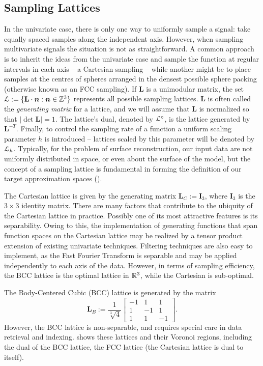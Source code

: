 \subsection{Sampling Lattices} \label{sec:smpl_review}
In the univariate case, there is only one way to uniformly sample a signal: take equally spaced samples along the independent axis. 
However, when sampling multivariate signals the situation is not as straightforward. 
A common approach is to inherit the ideas from the univariate case and sample the function at regular intervals in each axis -- a Cartesian sampling --  while another might be to place samples at the centres of spheres arranged in the densest possible sphere packing (otherwise known as an FCC sampling). 
If $\mathbf{L}$ is a unimodular matrix, the set $\mathcal{L} := \{\mathbf{L}\cdot\boldsymbol{n} : \boldsymbol{n} \in \mathbb{Z}^3 \}$ represents all possible sampling lattices. 
$\mathbf{L}$ is often called the \emph{generating matrix} for a lattice, and we will assume that $\mathbf{L}$ is normalized so that $\left|\det\mathbf{L}\right| = 1$. 
The lattice's dual, denoted by $\mathcal{L}^{\circ}$, is the lattice generated by $\mathbf{L}^{-T}$. Finally, to control the sampling rate of a function a uniform scaling parameter $h$ is introduced -- lattices scaled by this parameter will be denoted by $\mathcal{L}_h$. 
Typically, for the problem of surface reconstruction, our input data are not uniformly distributed in space, or even about the surface of the model, but the concept of a sampling lattice is fundamental in forming the definition of our target approximation spaces ().

The Cartesian lattice is given by the generating matrix $\mathbf{L}_C:=\mathbf{I}_3$, where $\mathbf{I}_3$ is the $3 \times 3$ identity matrix. 
There are many factors that contribute to the ubiquity of the Cartesian lattice in practice.
Possibly one of its most attractive features is its separability. 
Owing to this, the implementation of generating functions that span function spaces on the Cartesian lattice may be realized by a tensor product extension of existing univariate techniques. 
Filtering techniques are also easy to implement, as the Fast Fourier Transform is  separable and may be applied independently to each axis of the data. 
However, in terms of sampling efficiency, the BCC lattice is the optimal lattice in $\mathbb{R}^3$, while the Cartesian is sub-optimal.

The Body-Centered Cubic (BCC) lattice is generated by the matrix  {\footnotesize
\begin{equation*} 
	\mathbf{L}_B := \frac{1}{\sqrt[3]{4}}
	\begin{bmatrix}
		-1 & 1 & 1 \\ 
		1 & -1 & 1 \\ 
		1 & 1 & -1 
	\end{bmatrix}.
\end{equation*}}
However, the BCC lattice is non-separable, and requires special care in data retrieval and indexing. 
 shows these lattices and their Voronoi regions, including the dual of the BCC lattice, the FCC lattice (the Cartesian lattice is dual to itself).

